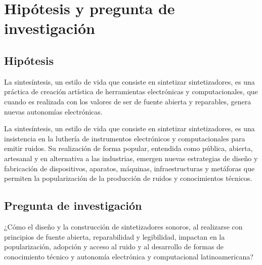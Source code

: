 \documentclass[../proyecto.tex]{subfiles}
\begin{document}
\chapter{Hipótesis y pregunta de investigación}

\section{Hipótesis}

La sintesíntesis, un estilo de vida que consiste en sintetizar sintetizadores, es una práctica de creación artística de herramientas electrónicas y computacionales, que cuando es realizada con los valores de ser de fuente abierta y reparables, genera nuevas autonomías electrónicas.

La sintesíntesis, un estilo de vida que consiste en sintetizar sintetizadores, es una insistencia en la luthería de instrumentos electrónicos y computacionales para emitir ruidos. Su realización de forma popular, entendida como pública, abierta, artesanal y en alternativa a las industrias, emergen nuevas estrategias de diseño y fabricación de dispositivos, aparatos, máquinas, infraestructuras y metáforas que permiten la popularización de la producción de ruidos y conocimientos técnicos.

\section{Pregunta de investigación}

¿Cómo el diseño y la construcción de sintetizadores sonoros, al realizarse con principios de fuente abierta, reparabilidad y legibilidad, impactan en la popularización, adopción y acceso al ruido y al desarrollo de formas de conocimiento técnico y autonomía electrónica y computacional latinoamericana?

\end{document}
